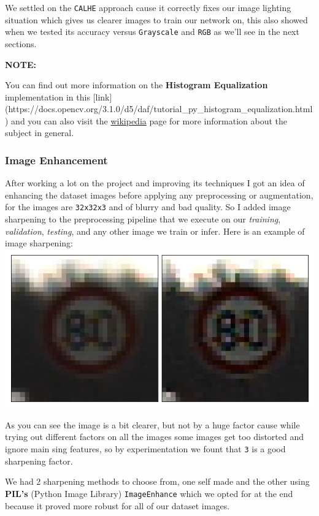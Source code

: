 \documentclass[11pt]{article}
\makeatletter
\def\maxwidth{\ifdim\Gin@nat@width>\linewidth\linewidth
    \else\Gin@nat@width\fi}
\let\Oldincludegraphics\includegraphics
\renewcommand{\includegraphics}[1]{\Oldincludegraphics[width=.8\maxwidth]{#1}}
\makeatother
\begin{document}
We settled on the \texttt{CALHE} approach cause it correctly fixes our
image lighting situation which gives us clearer images to train our
network on, this also showed when we tested its accuracy versus
\texttt{Grayscale} and \texttt{RGB} as we'll see in the next sections.

\textbf{NOTE:}

You can find out more information on the \textbf{Histogram Equalization}
implementation in this {[}link{]}
(https://docs.opencv.org/3.1.0/d5/daf/tutorial\_py\_histogram\_equalization.html)
and you can also visit the
\href{https://en.wikipedia.org/wiki/Histogram_equalization}{wikipedia}
page for more information about the subject in general.

    \hypertarget{image-enhancement}{%
\subsubsection{Image Enhancement}\label{image-enhancement}}

After working a lot on the project and improving its techniques I got an
idea of enhancing the dataset images before applying any preprocessing
or augmentation, for the images are \texttt{32x32x3} and of blurry and
bad quality. So I added image sharpening to the preprocessing pipeline
that we execute on our \emph{training}, \emph{validation},
\emph{testing}, and any other image we train or infer. Here is an
example of image sharpening:
\includegraphics{./assets/image_sharpening.png}

As you can see the image is a bit clearer, but not by a huge factor
cause while trying out different factors on all the images some images
get too distorted and ignore main sing features, so by experimentation
we fount that \texttt{3} is a good sharpening factor.

We had 2 sharpening methods to choose from, one self made and the other
using \textbf{PIL's} (Python Image Library) \texttt{ImageEnhance} which
we opted for at the end because it proved more robust for all of our
dataset images.
\end{document}
